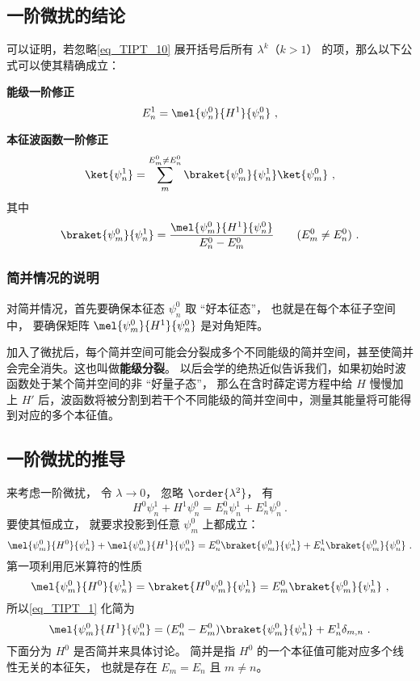 \subsection{一阶微扰的结论}
可以证明，若忽略\autoref{eq_TIPT_10} 展开括号后所有 $\lambda^k$（$k>1$） 的项，那么以下公式可以使其精确成立：

\textbf{能级一阶修正}
\begin{equation}\label{eq_TIPT_6}
E_n^1 = \mel{\psi_n^0}{H^1}{\psi_n^0}~,
\end{equation}

\textbf{本征波函数一阶修正}
\begin{equation}\label{eq_TIPT_5}
\ket{\psi_n^1} = \sum_m^{E_m^0 \ne E_n^0} \braket{\psi_m^0}{\psi_n^1} \ket{\psi_m^0}~,
\end{equation}
其中
\begin{equation}\label{eq_TIPT_4}
\braket{\psi_m^0}{\psi_n^1} = \frac{\mel{\psi_m^0}{H^1}{\psi_n^0}}{E_n^0 - E_m^0} \qquad (E_m^0 \ne E_n^0)~.
\end{equation}

\subsubsection{简并情况的说明}
对简并情况，首先要确保本征态 $\psi_n^0$ 取 “好本征态”， 也就是在每个本征子空间中， 要确保矩阵 $\mel{\psi_m^0}{H^1}{\psi_n^0}$ 是对角矩阵。

加入了微扰后，每个简并空间可能会分裂成多个不同能级的简并空间，甚至使简并会完全消失。这也叫做\textbf{能级分裂}。 以后会学的绝热近似告诉我们，如果初始时波函数处于某个简并空间的非 “好量子态”， 那么在含时薛定谔方程中给 $H$ 慢慢加上 $H'$ 后，波函数将被分割到若干个不同能级的简并空间中，测量其能量将可能得到对应的多个本征值。

\subsection{一阶微扰的推导}
来考虑一阶微扰， 令 $\lambda \to 0$， 忽略 $\order{\lambda^2}$， 有
\begin{equation}
H^0\psi_n^1 + H^1 \psi_n^0 = E_n^0 \psi_n^1 + E_n^1 \psi_n^0~.
\end{equation}
要使其恒成立， 就要求投影到任意 $\psi_m^0$ 上都成立：
\begin{equation}\label{eq_TIPT_1}
\mel{\psi_m^0}{H^0}{\psi_n^1} + \mel{\psi_m^0}{H^1}{\psi_n^0} = E_n^0 \braket{\psi_m^0}{\psi_n^1} + E_n^1 \braket{\psi_m^0}{\psi_n^0}~.
\end{equation}
第一项利用厄米算符的性质
\begin{equation}
\mel{\psi_m^0}{H^0}{\psi_n^1} = \braket{H^0\psi_m^0}{\psi_n^1} = E_m^0\braket{\psi_m^0}{\psi_n^1}~,
\end{equation}
所以\autoref{eq_TIPT_1} 化简为
\begin{equation}\label{eq_TIPT_2}
\mel{\psi_m^0}{H^1}{\psi_n^0} = (E_n^0 - E_m^0) \braket{\psi_m^0}{\psi_n^1} + E_n^1 \delta_{m,n}~.
\end{equation}
下面分为 $H^0$ 是否简并来具体讨论。 简并是指 $H^0$ 的一个本征值可能对应多个线性无关的本征矢， 也就是存在 $E_m=E_n$ 且 $m\ne n$。


